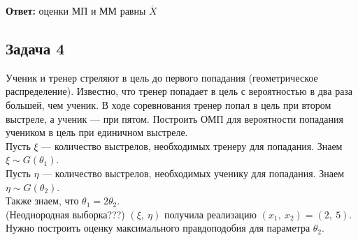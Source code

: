 \documentclass[12pt, a4paper]{article}
\begin{document}
\textbf{Ответ:} оценки МП и ММ равны $\overline{X}$
\subsection*{Задача 4}
Ученик и тренер стреляют в цель до первого попадания (геометрическое распределение). Известно, что тренер попадает в цель с вероятностью в два раза большей, чем ученик. В ходе соревнования тренер попал в цель при втором выстреле, а ученик --- при пятом. Построить ОМП для вероятности попадания учеником в цель при единичном выстреле.\\

Пусть $\xi$ --- количество выстрелов, необходимых тренеру для попадания. Знаем $\xi \sim G(\theta_1)$.\\
Пусть $\eta$ --- количество выстрелов, необходимых ученику для попадания. Знаем $\eta \sim G(\theta_2)$.\\
Также знаем, что $\theta_1 = 2\theta_2$.\\
(Неоднородная выборка???) $(\xi,\ \eta)$ получила реализацию $(x_1,\ x_2) = (2,\ 5)$. Нужно построить оценку максимального правдоподобия для параметра $\theta_2$.\\
\end{document}
